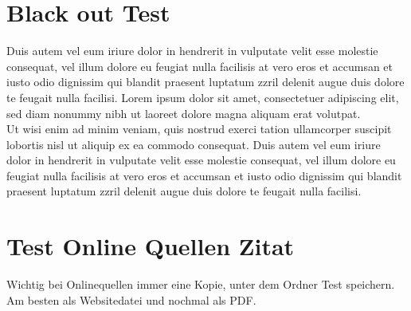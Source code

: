 	\section{Black out Test}
	 
	
	Duis autem vel eum iriure dolor in hendrerit in vulputate velit esse molestie consequat, vel illum dolore eu feugiat nulla facilisis at vero eros et accumsan et iusto odio dignissim qui blandit praesent luptatum zzril delenit augue duis dolore te feugait nulla facilisi. Lorem ipsum dolor sit amet, consectetuer adipiscing elit, sed diam nonummy nibh  ut laoreet dolore magna aliquam erat volutpat.\\
	
	Ut wisi enim ad minim veniam, quis nostrud exerci tation ullamcorper suscipit lobortis nisl ut aliquip ex ea commodo consequat. Duis autem vel eum iriure dolor in hendrerit in vulputate velit esse molestie consequat, vel illum dolore eu feugiat nulla facilisis at vero eros et accumsan et iusto odio dignissim qui blandit praesent luptatum zzril delenit augue duis dolore te feugait nulla facilisi.
	
	\section{Test Online Quellen Zitat}
	Wichtig bei Onlinequellen immer eine Kopie, unter dem Ordner Test  speichern. Am besten als Websitedatei und nochmal als PDF.\cite{qs.koeln}